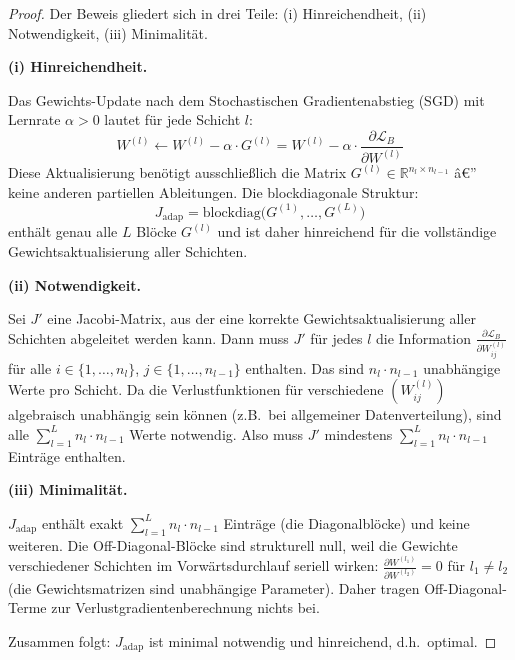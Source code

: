 ﻿\documentclass[a4paper,12pt]{article}
\theoremstyle{definition}
\begin{document}
\begin{proof}
	Der Beweis gliedert sich in drei Teile: (i) Hinreichendheit, (ii) Notwendigkeit, (iii) Minimalität.
	
	\medskip
	\textbf{(i) Hinreichendheit.}
	
	Das Gewichts-Update nach dem Stochastischen Gradientenabstieg (SGD) mit Lernrate $\alpha > 0$ lautet für jede Schicht $l$:
	\[
	W^{(l)} \leftarrow W^{(l)} - \alpha \cdot G^{(l)} = W^{(l)} - \alpha \cdot \frac{\partial \mathcal{L}_B}{\partial W^{(l)}}
	\]
	Diese Aktualisierung benötigt ausschließlich die Matrix $G^{(l)} \in \mathbb{R}^{n_l \times n_{l-1}}$ â€” keine anderen partiellen Ableitungen. Die blockdiagonale Struktur:
	\[
	J_{\mathrm{adap}} = \mathrm{blockdiag}\bigl(G^{(1)}, \ldots, G^{(L)}\bigr)
	\]
	enthält genau alle $L$ Blöcke $G^{(l)}$ und ist daher hinreichend für die vollständige Gewichtsaktualisierung aller Schichten.
	
	\medskip
	\textbf{(ii) Notwendigkeit.}
	
	Sei $J'$ eine Jacobi-Matrix, aus der eine korrekte Gewichtsaktualisierung aller Schichten abgeleitet werden kann. Dann muss $J'$ für jedes $l$ die Information $\frac{\partial \mathcal{L}_B}{\partial W^{(l)}_{ij}}$ für alle $i \in \{1,\ldots,n_l\}$, $j \in \{1,\ldots,n_{l-1}\}$ enthalten. Das sind $n_l \cdot n_{l-1}$ unabhängige Werte pro Schicht. Da die Verlustfunktionen für verschiedene $(W^{(l)}_{ij})$ algebraisch unabhängig sein können (z.B.\ bei allgemeiner Datenverteilung), sind alle $\sum_{l=1}^L n_l \cdot n_{l-1}$ Werte notwendig. Also muss $J'$ mindestens $\sum_{l=1}^L n_l \cdot n_{l-1}$ Einträge enthalten.
	
	\medskip
	\textbf{(iii) Minimalität.}
	
	$J_{\mathrm{adap}}$ enthält exakt $\sum_{l=1}^L n_l \cdot n_{l-1}$ Einträge (die Diagonalblöcke) und keine weiteren. Die Off-Diagonal-Blöcke sind strukturell null, weil die Gewichte verschiedener Schichten im Vorwärtsdurchlauf seriell wirken: $\frac{\partial W^{(l_1)}}{\partial W^{(l_2)}} = 0$ für $l_1 \neq l_2$ (die Gewichtsmatrizen sind unabhängige Parameter). Daher tragen Off-Diagonal-Terme zur Verlustgradientenberechnung nichts bei.
	
	Zusammen folgt: $J_{\mathrm{adap}}$ ist minimal notwendig und hinreichend, d.h.\ optimal.
\end{proof}
\end{document}
